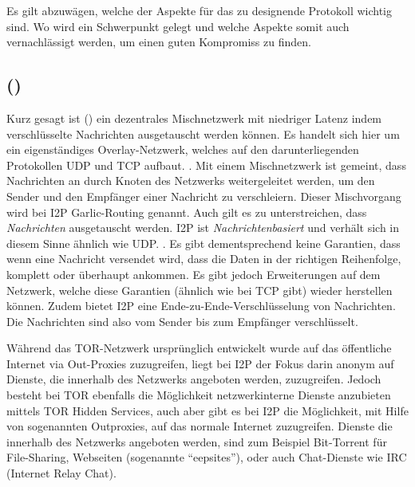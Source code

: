 Es gilt abzuwägen, welche der Aspekte für das zu designende Protokoll wichtig sind.
Wo wird ein Schwerpunkt gelegt und welche Aspekte somit auch vernachlässigt werden, um einen guten Kompromiss zu finden. \parencite{das_anonymity_2018}

\subsection{ ()}

Kurz gesagt ist  () ein dezentrales Mischnetzwerk mit niedriger Latenz indem verschlüsselte Nachrichten ausgetauscht werden können.
\parencite{zantout_i2p_2011}
Es handelt sich hier um ein eigenständiges Overlay-Netzwerk, welches auf den darunterliegenden Protokollen UDP und TCP aufbaut.  \parencite{de_boer_invisible_2019,astolfi_i2p_2015}.
Mit einem Mischnetzwerk ist gemeint, dass Nachrichten an durch Knoten des Netzwerks weitergeleitet werden, um den Sender und den Empfänger einer Nachricht zu verschleiern. Dieser Mischvorgang wird bei I2P Garlic-Routing genannt.
Auch gilt es zu unterstreichen, dass \textit{Nachrichten} ausgetauscht werden.
I2P ist \textit{Nachrichtenbasiert} und verhält sich in diesem Sinne ähnlich wie UDP. \parencite[S.~1]{zantout_i2p_2011}.
Es gibt dementsprechend keine Garantien, dass wenn eine Nachricht versendet wird, dass die Daten in der richtigen Reihenfolge, komplett oder überhaupt ankommen.
Es gibt jedoch Erweiterungen auf dem Netzwerk, welche diese Garantien (ähnlich wie bei TCP gibt) wieder herstellen können.
Zudem bietet I2P eine Ende-zu-Ende-Verschlüsselung von Nachrichten.
Die Nachrichten sind also vom Sender bis zum Empfänger verschlüsselt.

Während das TOR-Netzwerk ursprünglich entwickelt wurde auf das öffentliche Internet via Out-Proxies zuzugreifen,
liegt bei I2P der Fokus darin anonym auf Dienste, die innerhalb des Netzwerks angeboten werden, zuzugreifen.
Jedoch besteht bei TOR ebenfalls die Möglichkeit netzwerkinterne Dienste anzubieten mittels TOR Hidden Services, auch aber gibt es bei I2P die Möglichkeit, mit Hilfe von sogenannten Outproxies, auf das normale Internet zuzugreifen.
Dienste die innerhalb des Netzwerks angeboten werden, sind zum Beispiel Bit-Torrent für File-Sharing, Webseiten (sogenannte ``eepsites''), oder auch Chat-Dienste wie IRC (Internet Relay Chat).
\parencite[p.~3-4]{de_boer_invisible_2019}

\cite{astolfi_i2p_2015}

\cite{timpanaro_birds_2012}

